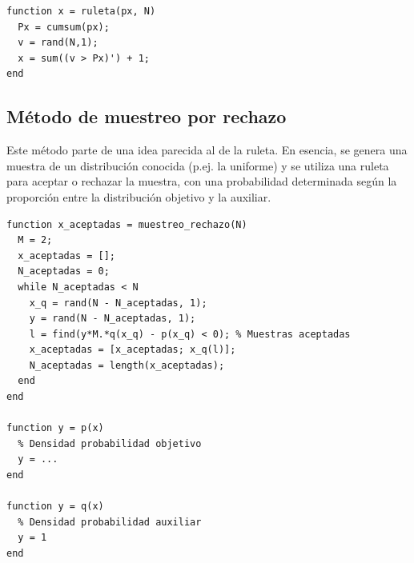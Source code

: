 \documentclass[10pt,twoside,spanish,a4paper]{article}
\begin{document}
\begin{lstlisting}
function x = ruleta(px, N)
  Px = cumsum(px);
  v = rand(N,1);
  x = sum((v > Px)') + 1;
end
\end{lstlisting}




\newpage
\subsection*{Método de muestreo por rechazo}
Este método parte de una idea parecida al de la ruleta. En esencia, se genera una muestra de un distribución conocida (p.ej. la uniforme) y
se utiliza una ruleta para aceptar o rechazar la muestra, con una probabilidad determinada según la proporción entre la distribución objetivo y la auxiliar.

\begin{lstlisting}
function x_aceptadas = muestreo_rechazo(N)
  M = 2; 
  x_aceptadas = [];
  N_aceptadas = 0;
  while N_aceptadas < N
    x_q = rand(N - N_aceptadas, 1);
    y = rand(N - N_aceptadas, 1);
    l = find(y*M.*q(x_q) - p(x_q) < 0); % Muestras aceptadas
    x_aceptadas = [x_aceptadas; x_q(l)];
    N_aceptadas = length(x_aceptadas); 
  end
end

function y = p(x)
  % Densidad probabilidad objetivo
  y = ...
end

function y = q(x)
  % Densidad probabilidad auxiliar
  y = 1
end
\end{lstlisting}
	
\end{document}
